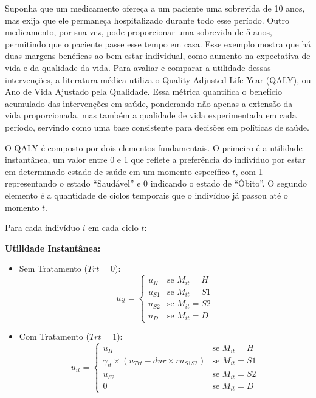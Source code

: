 \documentclass[12pt]{article}
\theoremstyle{break}
\begin{document}
Suponha que um medicamento ofereça a um paciente uma sobrevida de 10 anos, mas exija que ele permaneça hospitalizado durante todo esse período. Outro medicamento, por sua vez, pode proporcionar uma sobrevida de 5 anos, permitindo que o paciente passe esse tempo em casa. Esse exemplo mostra que há duas margens benéficas ao bem estar individual, como aumento na expectativa de vida e da qualidade da vida. Para avaliar e comparar a utilidade dessas intervenções, a literatura médica utiliza o Quality-Adjusted Life Year (QALY), ou Ano de Vida Ajustado pela Qualidade. Essa métrica quantifica o benefício acumulado das intervenções em saúde, ponderando não apenas a extensão da vida proporcionada, mas também a qualidade de vida experimentada em cada período, servindo como uma base consistente para decisões em políticas de saúde.

O QALY é composto por dois elementos fundamentais. O primeiro é a utilidade instantânea, um valor entre 0 e 1 que reflete a preferência do indivíduo por estar em determinado estado de saúde em um momento específico $t$, com 1 representando o estado ``Saudável'' e 0 indicando o estado de ``Óbito''. O segundo elemento é a quantidade de ciclos temporais que o indivíduo já passou até o momento $t$.

 

Para cada indivíduo \( i \) em cada ciclo \( t \):


\textbf{Utilidade Instantânea:}
    \begin{itemize}
        \item Sem Tratamento (\( Trt = 0 \)):
        \[
        u_{it} =
        \begin{cases}
            u_H & \text{se } M_{it} = H \\
            u_{S1} & \text{se } M_{it} = S1 \\
            u_{S2} & \text{se } M_{it} = S2 \\
            u_D & \text{se } M_{it} = D
        \end{cases}
        \]
        \item Com Tratamento (\( Trt = 1 \)):
        \[
        u_{it} =
        \begin{cases}
            u_H & \text{se } M_{it} = H \\
            \gamma_{it} \times (u_{Trt} - dur \times ru_{S1S2}) & \text{se } M_{it} = S1 \\
            u_{S2} & \text{se }  M_{it} =  S2 \\
            0 & \text{se } M_{it} = D
        \end{cases}
        \]
    \end{itemize}
\end{document}
